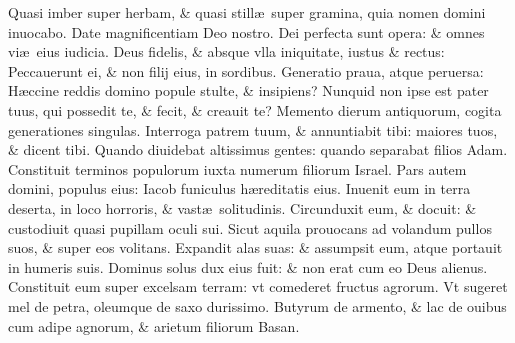 \documentclass[a5paper,10pt]{book}
\def\ae{æ}
\begin{document}
\begin{multicols*}{2}
\newline \color{red} Q\color{black}uasi imber super herbam, \& quasi still\ae \ super gramina, quia nomen domini inuocabo.
\newline \color{red} D\color{black}ate magnificentiam Deo nostro. Dei perfecta sunt opera: \& omnes vi\ae \ eius iudicia.
\newline \color{red} D\color{black}eus fidelis, \& absque vlla iniquitate, iustus \& rectus: Peccauerunt ei, \& non filij eius, in sordibus.
\newline \color{red} G\color{black}eneratio praua, atque peruersa: H\ae ccine reddis domino popule stulte, \& insipiens?
\newline \color{red} N\color{black}unquid non ipse est pater tuus, qui possedit te, \& fecit, \& creauit te?
\newline \color{red} M\color{black}emento dierum antiquorum, cogita generationes singulas.
\newline \color{red} I\color{black}nterroga patrem tuum, \& annuntiabit tibi: maiores tuos, \& dicent tibi.
\newline \color{red} Q\color{black}uando diuidebat altissimus gentes: quando separabat filios Adam.
\newline \color{red} C\color{black}onstituit terminos populorum iuxta numerum filiorum Israel.
\newline \color{red} P\color{black}ars autem domini, populus eius: Iacob funiculus h\ae reditatis eius.
\newline \color{red} I\color{black}nuenit eum in terra deserta, in loco horroris, \& vast\ae \ solitudinis.
\newline \color{red} C\color{black}ircunduxit eum, \& docuit: \& custodiuit quasi pupillam oculi sui.
\newline \color{red} S\color{black}icut aquila prouocans ad volandum pullos suos, \& super eos volitans.
\newline \color{red} E\color{black}xpandit alas suas: \& assumpsit eum, atque portauit in humeris suis.
\newline \color{red} D\color{black}ominus solus dux eius fuit: \& non erat cum eo Deus alienus.
\newline \color{red} C\color{black}onstituit eum super excelsam terram: vt comederet fructus agrorum.
\newline \color{red} V\color{black}t sugeret mel de petra, oleumque de saxo durissimo.
\newline \color{red} B\color{black}utyrum de armento, \& lac de ouibus cum adipe agnorum, \& arietum filiorum Basan.

\end{multicols*}
\end{document}
